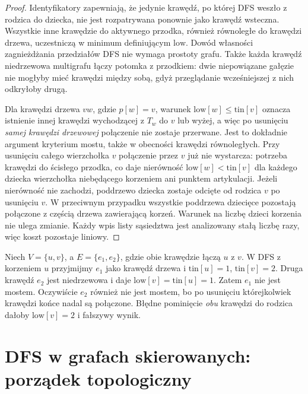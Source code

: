 \begin{proof}
Identyfikatory zapewniają, że jedynie
krawędź, po której DFS weszło z
rodzica do dziecka, nie jest rozpatrywana
ponownie jako krawędź wsteczna.
Wszystkie inne krawędzie do
aktywnego przodka, również równoległe
do krawędzi drzewa, uczestniczą
w minimum definiującym $\mathrm{low}$.
Dowód własności zagnieżdżania
przedziałów DFS nie wymaga
prostoty grafu. Także każda krawędź
niedrzewowa multigrafu łączy
potomka z przodkiem: dwie
niepowiązane gałęzie nie mogłyby
mieć krawędzi między sobą,
gdyż przeglądanie wcześniejszej
z nich odkryłoby drugą.

Dla krawędzi drzewa $vw$,
gdzie $p[w]=v$, warunek
$\mathrm{low}[w]\leq\mathrm{tin}[v]$
oznacza istnienie innej
krawędzi wychodzącej z
$T_w$ do $v$ lub wyżej,
a więc po usunięciu
\emph{samej krawędzi drzewowej}
połączenie nie zostaje przerwane.
Jest to dokładnie argument
kryterium mostu, także w
obecności krawędzi równoległych.
Przy usunięciu całego wierzchołka
$v$ połączenie przez $v$
już nie wystarcza: potrzeba
krawędzi do ścisłego przodka,
co daje nierówność
$\mathrm{low}[w]<\mathrm{tin}[v]$
dla każdego dziecka wierzchołka
niebędącego korzeniem ani punktem artykulacji.
Jeżeli nierówność nie zachodzi, poddrzewo dziecka
zostaje odcięte od rodzica $v$ po usunięciu $v$.
W przeciwnym przypadku wszystkie poddrzewa dziecięce
pozostają połączone z częścią drzewa zawierającą korzeń.
Warunek na liczbę dzieci
korzenia nie ulega zmianie.
Każdy wpis listy sąsiedztwa
jest analizowany stałą liczbę
razy, więc koszt pozostaje liniowy.
\end{proof}

\begin{przyklad}
\label{ex:tg-dfs-parallel-edges}
Niech $V=\{u,v\}$, a $E=\{e_1,e_2\}$,
gdzie obie krawędzie łączą $u$ z $v$.
W DFS z korzeniem $u$ przyjmijmy
$e_1$ jako krawędź drzewa i
$\mathrm{tin}[u]=1$, $\mathrm{tin}[v]=2$.
Druga krawędź $e_2$ jest niedrzewowa
i daje
$\mathrm{low}[v]=\mathrm{tin}[u]=1$.
Zatem $e_1$ nie jest mostem.
Oczywiście $e_2$ również nie jest
mostem, bo po usunięciu którejkolwiek
krawędzi końce nadal są połączone.
Błędne pominięcie \emph{obu}
krawędzi do rodzica
dałoby $\mathrm{low}[v]=2$
i fałszywy wynik.
\end{przyklad}

\section{DFS w grafach skierowanych: porządek topologiczny}
\label{sec:tg-algo-dag}

